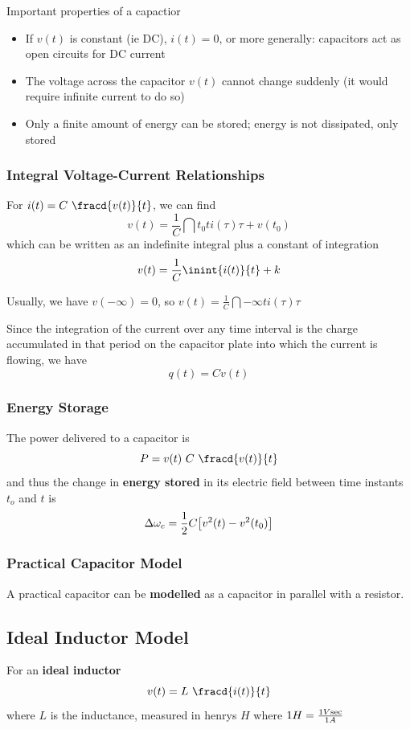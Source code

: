 \documentclass[12pt]{article}
\begin{document}
Important properties of a capactior
\begin{itemize}
\item If $v(t)$ is constant (ie DC), $i(t) = 0$, or more generally: capacitors act as open circuits for DC current
\item The voltage across the capacitor $v(t)$ cannot change suddenly (it would require infinite current to do so)
\item Only a finite amount of energy can be stored; energy is not dissipated, only stored
\end{itemize}

\subsubsection*{Integral Voltage-Current Relationships}
For $i(t) = C\ \fracd{v(t)}{t}$, we can find \[ v(t) = \frac{1}{C} \dint{t_0}{t}{i(\tau)}{\tau} + v(t_0) \] which can be written as an indefinite integral plus a constant of integration \[ v(t) = \frac{1}{C} \inint{i(t)}{t} + k \]

Usually, we have $v(-\infty) = 0$, so $v(t) = \frac{1}{C} \dint{-\infty}{t}{i(\tau)}{\tau}$

Since the integration of the current over any time interval is the charge accumulated in that period on the capacitor plate into which the current is flowing, we have \[ q(t) = Cv(t) \]

\subsubsection*{Energy Storage}
The power delivered to a capacitor is \[ P = v(t)\ C\ \fracd{v(t)}{t} \] and thus the change in {\bf energy stored} in its electric field between time instants $t_o$ and $t$ is \[ \Delta\omega_c = \frac{1}{2} C\bigl[v^2(t) - v^2(t_0)\bigl] \]

\subsubsection*{Practical Capacitor Model}
A practical capacitor can be {\bf modelled} as a capacitor in parallel with a resistor.

\subsection*{Ideal Inductor Model}
For an {\bf ideal inductor} \[ v(t) = L\ \fracd{i(t)}{t} \] where $L$ is the inductance, measured in henrys $H$ where $1H = \frac{1V{\rm sec}}{1A}$
\end{document}
